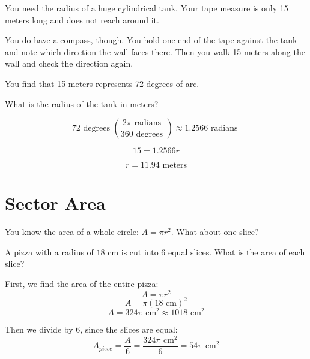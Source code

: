 \begin{Exercise}[title={Arc Length}, label=arc_length]

You need the radius of a huge cylindrical tank. Your tape measure is only
15 meters long and does not reach around it.

You do have a compass, though. You hold one end of the tape against the tank
and note which direction the wall faces there. Then you walk 15 meters
along the wall and check the direction again.

You find that 15 meters represents 72 degrees of arc.

What is the radius of the tank in meters?
  
\end{Exercise}
\begin{Answer}[ref=arc_length]

  $$72 \text{ degrees } \left(\frac{2\pi \text{ radians }}{360 \text{ degrees }
  }\right) \approx 1.2566 \text{ radians }$$

  $$15 = 1.2566r$$

  $$r = 11.94 \text{ meters}$$
  
\end{Answer}

\section{Sector Area}
You know the area of a whole circle: $A = \pi r^2$. What about one slice?

\begin{Worked}
\begin{Problem}
A pizza with a radius of $18$ cm is cut into 6 equal
slices. What is the area of each slice?
\end{Problem}
\begin{Solution}
First, we find the area of the entire pizza:
$$A = \pi r^2$$
$$A = \pi (18\text{ cm})^2$$
$$A = 324\pi\text{ cm}^2 \approx 1018\text{ cm}^2$$

Then we divide by 6, since the slices are equal:
$$A_{piece} = \frac{A}{6} = \frac{324\pi\text{ cm}^2}{6} = 54\pi\text{ cm}^2$$
\end{Solution}
\end{Worked}

